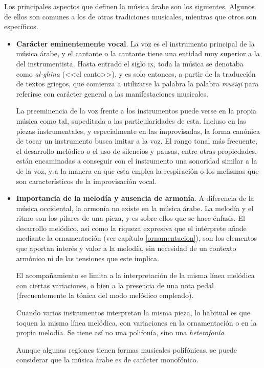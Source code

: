     Los principales aspectos que definen la música árabe son los siguientes. Algunos de ellos son comunes a los de otras tradiciones musicales, mientras que otros son específicos.

    \begin{itemize}
    \item \textbf{Carácter eminentemente vocal}. La voz es el instrumento principal de la música árabe, y el cantante o la cantante tiene una entidad muy superior a la del instrumentista. Hasta entrado el siglo \textsc{ix}, toda la música se denotaba como \emph{al-ghina} (<<el canto>>), y es solo entonces, a partir de la traducción de textos griegos, que comienza a utilizarse la palabra la palabra \emph{musiqi} para referirse con carácter general a las manifestaciones musicales.

    La preeminencia de la voz frente a los instrumentos puede verse en la propia música como tal, supeditada a las particularidades de esta. Incluso en las piezas instrumentales, y especialmente en las improvisadas, la forma canónica de tocar un instrumento busca imitar a la voz. El rango tonal más frecuente, el desarrollo melódico o el uso de silencios y pausas, entre otras propiedades, están encaminadas a conseguir con el instrumento una sonoridad similar a la de la voz, y a la manera en que esta emplea la respiración o los melismas que son característicos de la improvisación vocal.

    \item \textbf{Importancia de la melodía y ausencia de armonía}. A diferencia de la música occidental, la armonía no existe en la música árabe. La melodía y el ritmo son los pilares de una pieza, y es sobre ellos que se hace énfasis. El desarrollo melódico, así como la riqueza expresiva que el intérprete añade mediante la ornamentación (ver capítulo \ref{ornamentacion}), son los elementos que aportan interés y valor a la melodía, sin necesidad de un contexto armónico ni de las tensiones que este implica.

    El acompañamiento se limita a la interpretación de la misma línea melódica con ciertas variaciones, o bien a la presencia de una nota pedal (frecuentemente la tónica del modo melódico empleado).

    Cuando varios instrumentos interpretan la misma pieza, lo habitual es que toquen la misma línea melódica, con variaciones en la ornamentación o en la propia melodía. Se tiene así no una polifonía, sino una \emph{heterofonía}.

    Aunque algunas regiones tienen formas musicales polifónicas, se puede considerar que la música árabe es de carácter monofónico.


\end{itemize}
